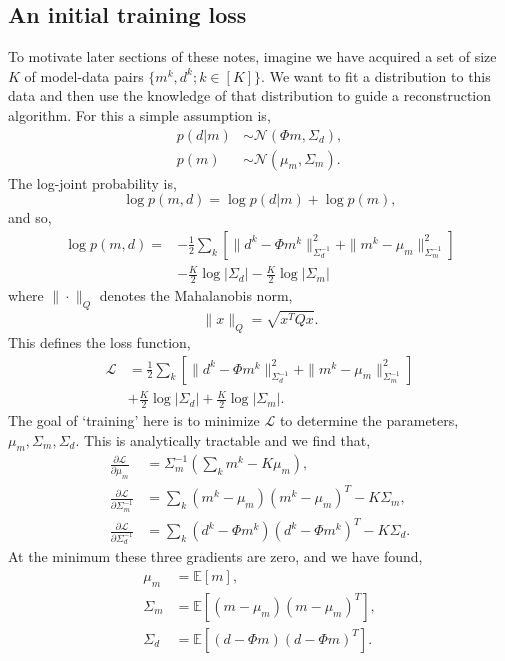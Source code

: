 \documentclass[12pt]{article}
\begin{document}
\subsection{An initial training loss}\label{sec:bayes_training}
To motivate later sections of these notes, imagine we have acquired a set of size $K$ of model-data pairs $\{ m^{k},d^{k}; k \in [K]\}$. We want to fit a distribution to this data and then use the knowledge of that distribution to guide a reconstruction algorithm. For this a simple assumption is,
\begin{align}
p(d|m) & \sim \mathcal{N}(\Phi m , \Sigma_d), \\
p(m) & \sim \mathcal{N}(\mu_m ,\Sigma_m).
\end{align} 
The log-joint probability is,
\begin{equation}
\log{  p(m,d)} = \log{p(d|m)}+\log{p(m)},
\end{equation} 
and so,
\begin{align}
\log{ p(m,d)} =& -\frac{1}{2}\sum_{k} \left[\|d^k-\Phi m^k\|_{\Sigma_d^{-1}}^2+\|m^k-\mu_m\|_{\Sigma_m^{-1}}^2\right] \nonumber\\
&- \frac{K}{2}\log{|\Sigma_d|} - \frac{K}{2}\log{|\Sigma_m|}
\end{align}
where $\|\cdot \|_{Q}$ denotes the Mahalanobis norm,
\begin{equation}
\|x\|_{Q}=\sqrt{x^T Qx}.
\end{equation}
This defines the loss function,
\begin{align}
\mathcal{L}&=\frac{1}{2}\sum_{k} \left[\|d^k-\Phi m^k\|_{\Sigma_d^{-1}}^2+\|m^k-\mu_m\|_{\Sigma_m^{-1}}^2\right] \nonumber\\
&+ \frac{K}{2}\log{|\Sigma_d|} + \frac{K}{2}\log{|\Sigma_m|}.
\end{align}
The goal of `training' here is to minimize $\mathcal{L}$ to determine the parameters, $\mu_m, \Sigma_m, \Sigma_d$. This is analytically tractable and we find that,
\begin{align}
\frac{\partial \mathcal{L}}{\partial \mu_m}&=\Sigma_m^{-1}(\sum_k m^k - K \mu_m),\\
\frac{\partial \mathcal{L}}{\partial \Sigma_m^{-1}}&=\sum_k (m^k-\mu_m)(m^k-\mu_m)^T-K\Sigma_m,\\
\frac{\partial \mathcal{L}}{\partial \Sigma_d^{-1}}&=\sum_k (d^k-\Phi m^k)(d^k-\Phi m^k)^T-K\Sigma_d.
\end{align}
At the minimum these three gradients are zero, and we have found,
\begin{align}
\mu_m &= \mathbb{E}[m],\\
\Sigma_m & =\mathbb{E}[(m-\mu_m)(m-\mu_m)^T],\\
\Sigma_d & = \mathbb{E}[(d-\Phi m)(d-\Phi m)^T].
\end{align}
\end{document}
